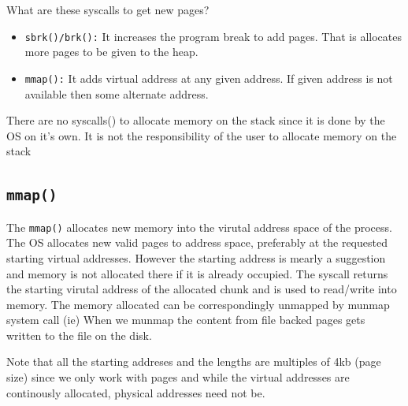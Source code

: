 \documentclass[12pt]{article}
\begin{document}
    
    







What are these syscalls to get new pages?
\begin{itemize}[topsep=0pt, partopsep=0pt, itemsep=0pt, parsep=0pt]
    \item \texttt{sbrk()/brk():} It increases the program break to add pages. That is allocates more pages to be given to the heap. 
    \item \texttt{mmap():} It adds virtual address at any given address. If given address is not available then some alternate address.
\end{itemize}
There are no syscalls() to allocate memory on the stack since it is done by the OS on it's own. It is not the responsibility of the user to allocate memory on the stack


\subsection{\texttt{mmap()}}
The \texttt{mmap()}  allocates new memory into the virutal address space of the process. 
The OS allocates new valid pages to address space, preferably at the requested starting virtual addresses. However the starting address is mearly a suggestion
and memory is not allocated there if it is already occupied. The syscall returns the starting virutal address of the allocated chunk and is used to read/write into memory.
The memory allocated can be correspondingly unmapped by munmap system call (ie) When we munmap the content from file backed pages gets written to the file on the disk. 

Note that all the starting addreses and the lengths are multiples of 4kb (page size) since we only work with pages and while the virtual addresses are continously allocated, physical addresses need not be.
\end{document}
